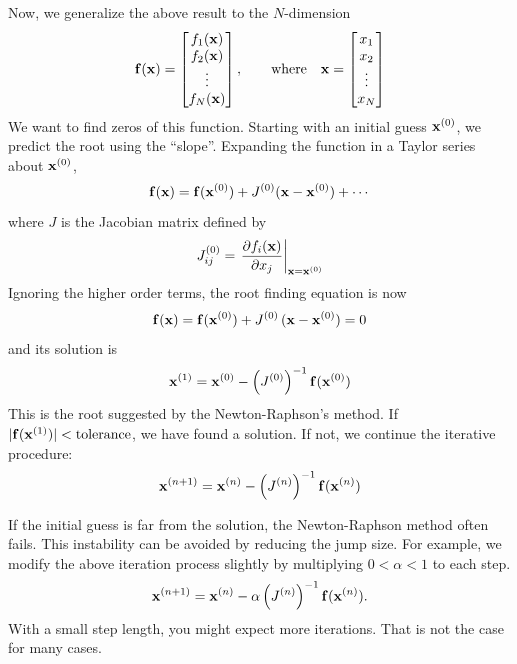 Now, we generalize the above result to the $N$-dimension
\begin{equation}
\vb{f}(\vb{x}) = \begin{bmatrix} f_1(\vb{x}) \\ f_2(\vb{x}) \\ \vdots \\ f_N({\vb{x}}) \end{bmatrix}
, \qquad \text{where} \quad
\vb{x} = \begin{bmatrix} x_1 \\ x_2 \\ \vdots \\ x_N \end{bmatrix}
\end{equation}
We want to find zeros of this function.   Starting with an initial guess $\vb{x}^{(0)}$, we predict the root using the ``slope''.   Expanding the function in a Taylor series about $\vb{x}^{(0)}$,
\begin{equation}
\vb{f}(\vb{x}) = \vb{f}(\vb{x}^{(0)}) + J^{(0)} (\vb{x}-\vb{x}^{(0)}) + \cdots
\end{equation}
where $J$ is the Jacobian matrix defined by
\begin{equation}
J^{(0)}_{ij} = \left . \frac{\partial f_i(\vb{x})}{\partial x_j} \right |_{\vb{x}=\vb{x}^{(0)}}
\end{equation}
Ignoring the higher order terms, the root finding equation is now
\begin{equation}
\vb{f}(\vb{x}) = \vb{f}(\vb{x}^{(0)}) + J^{(0)}\, (\vb{x}-\vb{x}^{(0)}) = 0
\end{equation}
and its solution is
\begin{equation}
\vb{x}^{(1)} = \vb{x}^{(0)} - \left (J^{(0)}\right )^{-1} \vb{f}(\vb{x}^{(0)})
\end{equation}
This is the root suggested by the Newton-Raphson's method.  If $|\vb{f}(\vb{x}^{(1)})| < \text{tolerance}$, we have found a solution.
If not, we continue the iterative procedure:
\begin{equation}
\vb{x}^{(n+1)} = \vb{x}^{(n)} - \left( J^{(n)}\right )^{-1} \vb{f}(\vb{x}^{(n)})
\end{equation}

If the initial guess is far from the solution, the Newton-Raphson method often fails. This instability can be avoided by reducing the jump size.  For example, we modify the above iteration process slightly by multiplying $0< \alpha < 1$ to each step.
\begin{equation}
\vb{x}^{(n+1)} = \vb{x}^{(n)} - \alpha \left( J^{(n)}\right )^{-1} \vb{f}(\vb{x}^{(n)}).
\end{equation}
With  a small step length, you might expect more iterations.  That is not the case for many cases.  

